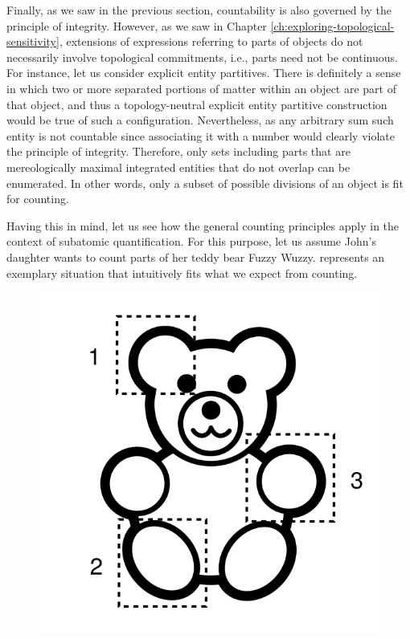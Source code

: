 Finally, as we saw in the previous section, countability is also governed by the principle of integrity. However, as we saw in Chapter \ref{ch:exploring-topological-sensitivity}, extensions of expressions referring to parts of objects do not necessarily involve topological commitments, i.e., parts need not be continuous. For instance, let us consider explicit entity partitives. There is definitely a sense in which two or more separated portions of matter within an object are part of that object, and thus a topology-neutral explicit entity partitive construction would be true of such a configuration. Nevertheless, as any arbitrary sum such entity is not countable since associating it with a number would clearly violate the principle of integrity. Therefore, only sets including parts that are mereologically maximal integrated entities that do not overlap can be enumerated. In other words, only a subset of possible divisions of an object is fit for counting.

Having this in mind, let us see how the general counting principles apply in the context of subatomic quantification. For this purpose, let us assume John's daughter wants to count parts of her teddy bear Fuzzy Wuzzy.  represents an exemplary situation that intuitively fits what we expect from counting. 

\begin{figure}[h!]
\centering
\includegraphics[scale=0.5]{figures/toy_counting-parts.png}
\label{fig:counting-of-parts}
\end{figure}

